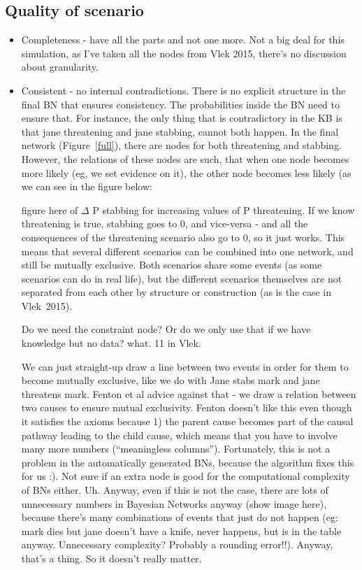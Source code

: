 \subsection{Quality of scenario}
\begin{itemize}
\item Completeness - have all the parts and not one more. Not a big deal for this simulation, as I've taken all the nodes from Vlek 2015, there's no discussion about granularity.

\item Consistent - no internal contradictions. There is no explicit structure in the final BN that ensures consistency. The probabilities inside the BN need to ensure that. For instance, the only thing that is contradictory in the KB is that jane threatening and jane stabbing, cannot both happen. In the final network (Figure~\ref{full}), there are nodes for both threatening and stabbing. However, the relations of these nodes are such, that when one node becomes more likely (eg, we set evidence on it),  the other node becomes less likely (as we can see in the figure below:

figure here of $\Delta$ P stabbing for increasing values of P threatening. If we know threatening is true, stabbing goes to 0, and vice-versa - and all the consequences of the threatening scenario also go to 0, so it just works. This means that several different scenarios can be combined into one network, and still be mutually exclusive. Both scenarios share some events (as some scenarios can do in real life), but the different scenarios themselves are not separated from each other by structure or construction (as is the case in Vlek~2015).

Do we need the constraint node? Or do we only use that if we have knowledge but no data? what. 11 in Vlek.

We can just straight-up draw a line between two events in order for them to become mutually exclusive, like we do with Jane stabs mark and jane threatens mark. Fenton et al advice against that - we draw a relation between two causes to ensure mutual exclusivity. Fenton doesn't like this even though it satisfies the axioms because 1) the parent cause becomes part of the causal pathway leading to the child cause, which means that you have to involve many more numbers (``meaningless columns''). Fortunately, this is not a problem in the automatically generated BNs, because the algorithm fixes this for us :). Not sure if an extra node is good for the computational complexity of BNs either. Uh. Anyway, even if this is not the case, there are lots of unnecessary numbers in Bayesian Networks anyway (show image here), because there's many combinations of events that just do not happen (eg: mark dies but jane doesn't have a knife, never happens, but is in the table anyway. Unnecessary complexity? Probably a rounding error!!). Anyway, that's a thing. So it doesn't really matter.


\end{itemize}
